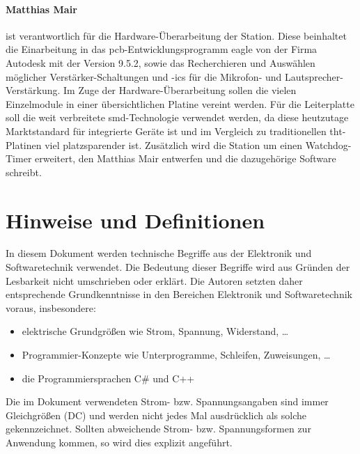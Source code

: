 \paragraph{Matthias Mair} ist verantwortlich für die Hardware-Überarbeitung der Station.
Diese beinhaltet die Einarbeitung in das \ac{pcb}-Entwicklungsprogramm \ac{eagle} von der Firma Autodesk mit der Version 9.5.2, sowie das Recherchieren und Auswählen möglicher Verstärker-Schaltungen und -\acp{ic} für die Mikrofon- und Lautsprecher-Verstär\-kung.
Im Zuge der Hardware-Überarbeitung sollen die vielen Einzelmodule in einer übersichtlichen Platine vereint werden.
Für die Leiterplatte soll die weit verbreitete \ac{smd}-Technologie verwendet werden, da diese heutzutage Marktstandard für integrierte Geräte ist und im Vergleich zu traditionellen \ac{tht}-Platinen viel platzsparender ist.
Zusätzlich wird die Station um einen Watchdog-Timer erweitert, den Matthias Mair entwerfen und die dazugehörige Software schreibt.

\section{Hinweise und Definitionen}
In diesem Dokument werden technische Begriffe aus der Elektronik und Softwaretechnik verwendet.
Die Bedeutung dieser Begriffe wird aus Gründen der Lesbarkeit nicht umschrieben oder erklärt.
Die Autoren setzten daher entsprechende Grundkenntnisse in den Bereichen Elektronik und Softwaretechnik voraus, insbesondere: 
\begin{itemize}
    \item elektrische Grundgrößen wie Strom, Spannung, Widerstand, \dots
    \item Programmier-Konzepte wie Unterprogramme, Schleifen, Zuweisungen, \dots
    \item die Programmiersprachen C\# und C++
\end{itemize}
Die im Dokument verwendeten Strom- bzw. Spannungsangaben sind immer Gleichgrößen (DC) und werden nicht jedes Mal ausdrücklich als solche gekennzeichnet. Sollten abweichende Strom- bzw. Spannungsformen zur Anwendung kommen, so wird dies explizit angeführt.